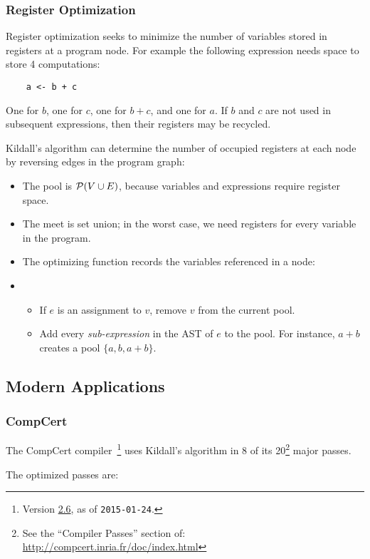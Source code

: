 \documentclass{article}
\begin{document}
\subsubsection*{Register Optimization}
Register optimization seeks to minimize the number of variables stored in registers at a program node.
For example the following expression needs space to store 4 computations:
\begin{lstlisting}
    a <- b + c
\end{lstlisting}
One for $b$, one for $c$, one for $b + c$, and one for $a$.
If $b$ and $c$ are not used in subsequent expressions, then their registers may be recycled.

Kildall's algorithm can determine the number of occupied registers at each node by reversing edges in the program graph:
\begin{itemize}
\item The pool is $\mathcal{P}(V \cup E)$, because variables and expressions require register space.
\item The meet is set union; in the worst case, we need registers for every variable in the program.
\item The optimizing function records the variables referenced in a node:
\item[]
  \begin{itemize}
  \item If $e$ is an assignment to $v$, remove $v$ from the current pool.
  \item Add every \emph{sub-expression} in the AST of $e$ to the pool.
    For instance, $a + b$ creates a pool $\{a, b, a + b\}$.
  \end{itemize}
\end{itemize}


\subsection*{Modern Applications}

\subsubsection*{CompCert}
The CompCert compiler~\cite{src,refman}\footnote{Version \href{https://github.com/AbsInt/CompCert/releases}{2.6}, as of \texttt{2015-01-24}.} uses Kildall's algorithm in 8 of its 20\footnote{See the ``Compiler Passes'' section of: \url{http://compcert.inria.fr/doc/index.html}} major passes.

The optimized passes are:
\end{document}
